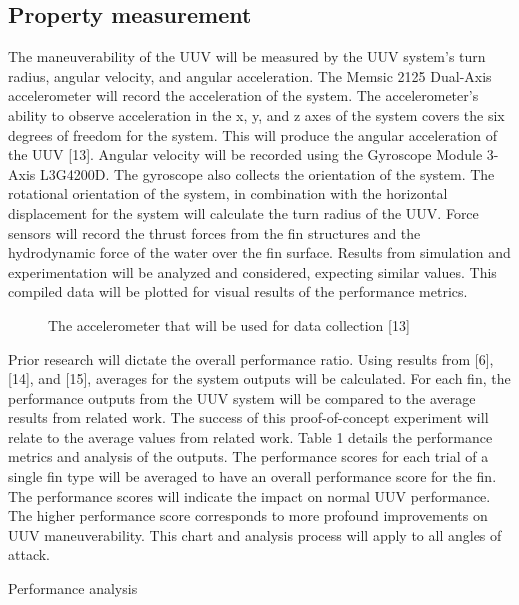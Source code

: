 \documentclass{IEEEtran}
\begin{document}
\subsection{Property measurement}
The maneuverability of the UUV will be measured by the UUV system’s turn radius, angular velocity, and angular acceleration. The Memsic 2125 Dual-Axis accelerometer will record the acceleration of the system.  The accelerometer’s ability to observe acceleration in the x, y, and z axes of the system covers the six degrees of freedom for the system.  This will produce the angular acceleration of the UUV [13].  Angular velocity will be recorded using the Gyroscope Module 3-Axis L3G4200D.  The gyroscope also collects the orientation of the system.  The rotational orientation of the system, in combination with the horizontal displacement for the system will calculate the turn radius of the UUV.  Force sensors will record the thrust forces from the fin structures and the hydrodynamic force of the water over the fin surface.  Results from simulation and experimentation will be analyzed and considered, expecting similar values.  This compiled data will be plotted for visual results of the performance metrics.  
\begin{figure}
\caption{The accelerometer that will be used for data collection [13]}
\label{fig:6}
\end{figure}

Prior research will dictate the overall performance ratio.  Using results from [6], [14], and [15], averages for the system outputs will be calculated.  For each fin, the performance outputs from the UUV system will be compared to the average results from related work.  The success of this proof-of-concept experiment will relate to the average values from related work.  Table 1 details the performance metrics and analysis of the outputs.  The performance scores for each trial of a single fin type will be averaged to have an overall performance score for the fin.  The performance scores will indicate the impact on normal UUV performance.  The higher performance score corresponds to more profound improvements on UUV maneuverability.  This chart and analysis process will apply to all angles of attack.    
\begin{table}
\caption{Performance analysis}
\label{tab:1}
\end{table}
\end{document}
